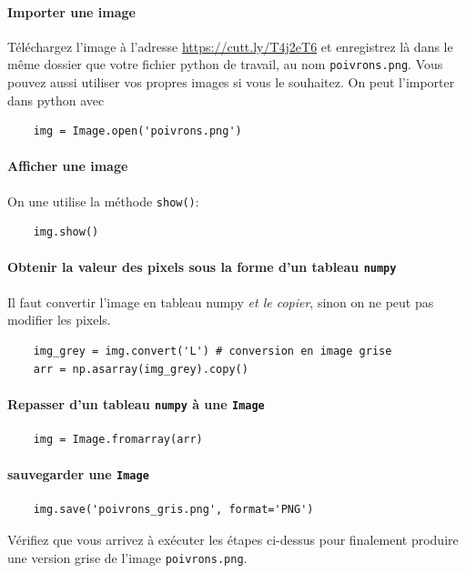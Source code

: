 \paragraph*{Importer une image} Téléchargez l'image à l'adresse \href{https://cutt.ly/T4j2eT6}{https://cutt.ly/T4j2eT6} et enregistrez là dans le même dossier que votre fichier python de travail, au nom \texttt{poivrons.png}. Vous pouvez aussi utiliser vos propres images si vous le souhaitez. On peut l'importer dans python avec
\begin{verbatim}
    img = Image.open('poivrons.png')
\end{verbatim}

\paragraph*{Afficher une image} On une utilise la méthode \texttt{show()}:
\begin{verbatim}
    img.show()
\end{verbatim}

\paragraph*{Obtenir la valeur des pixels sous la forme d'un tableau \texttt{numpy}} Il faut convertir l'image en tableau numpy \emph{et le copier}, sinon on ne peut pas modifier les pixels.
\begin{verbatim}
    img_grey = img.convert('L') # conversion en image grise
    arr = np.asarray(img_grey).copy()
\end{verbatim}

\paragraph*{Repasser d'un tableau \texttt{numpy} à une \texttt{Image}}
\begin{verbatim}
    img = Image.fromarray(arr)
\end{verbatim}

\paragraph*{sauvegarder une \texttt{Image}}
\begin{verbatim}
    img.save('poivrons_gris.png', format='PNG')
\end{verbatim}

\ques Vérifiez que vous arrivez à exécuter les étapes ci-dessus pour finalement produire une version grise de l'image \texttt{poivrons.png}.

